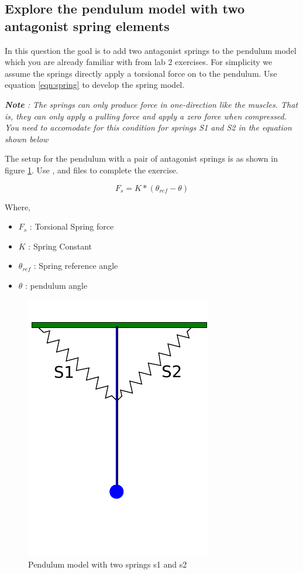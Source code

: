 \documentclass{cmc}
\begin{document}
\subsection*{Explore the pendulum model with two antagonist spring
  elements}

In this question the goal is to add two antagonist springs to the
pendulum model which you are already familiar with from lab 2
exercises. For simplicity we assume the springs directly apply a
torsional force on to the pendulum.  Use equation \ref{eqn:spring} to
develop the spring model.

\textit{\textbf{Note} : The springs can only produce force in
  one-direction like the muscles.  That is, they can only apply a
  pulling force and apply a zero force when compressed.  You need to
  accomodate for this condition for springs S1 and S2 in the equation
  shown below}

The setup for the pendulum with a pair of antagonist springs is as
shown in figure \ref{fig:pendulum_spring}. Use ,
 and  files to
complete the exercise.

\begin{equation}
  \label{eqn:spring}
  F_{s} = K*(\theta_{ref} - \theta)
\end{equation}

Where,
\begin{itemize}
\item $F_{s}$ : Torsional Spring force
\item $K$ : Spring Constant
\item $\theta_{ref}$ : Spring reference angle
\item $\theta$ : pendulum angle
\end{itemize}


\begin{figure}[H]
  \centering
  \includegraphics[width=.3\textwidth]{figures/pendulum_spring}
  \caption[pendulum with spring]{Pendulum model with two springs s1
    and s2}
  \label{fig:pendulum_spring}
\end{figure}
\end{document}

